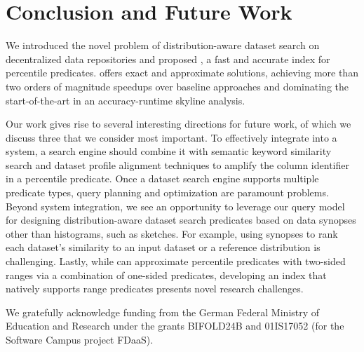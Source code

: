 
\section{Conclusion and Future Work}
\label{sec:conclusion}

We introduced the novel problem of distribution-aware dataset search on decentralized data repositories and proposed \system{}, a fast and accurate index for percentile predicates.
\system{} offers exact and approximate solutions, achieving more than two orders of magnitude speedups over baseline approaches and dominating the start-of-the-art in an accuracy-runtime skyline analysis.

Our work gives rise to several interesting directions for future work, of which we discuss three that we consider most important.
To effectively integrate \system{} into a system, a search engine should combine it with semantic keyword similarity search and dataset profile alignment techniques to amplify the column identifier in a percentile predicate.
Once a dataset search engine supports multiple predicate types, query planning and optimization are paramount problems.
Beyond system integration, we see an opportunity to leverage our query model for designing distribution-aware dataset search predicates based on data synopses other than histograms, such as sketches.
For example, using synopses to rank each dataset's similarity to an input dataset or a reference distribution is challenging.
Lastly, while \system{} can approximate percentile predicates with two-sided ranges via a combination of one-sided predicates, developing an index that natively supports range predicates presents novel research challenges.

\begin{acks}
    We gratefully acknowledge funding from the German Federal Ministry of Education and Research under the grants BIFOLD24B and 01IS17052 (for the Software Campus project FDaaS).
\end{acks}

\flushcolsend
